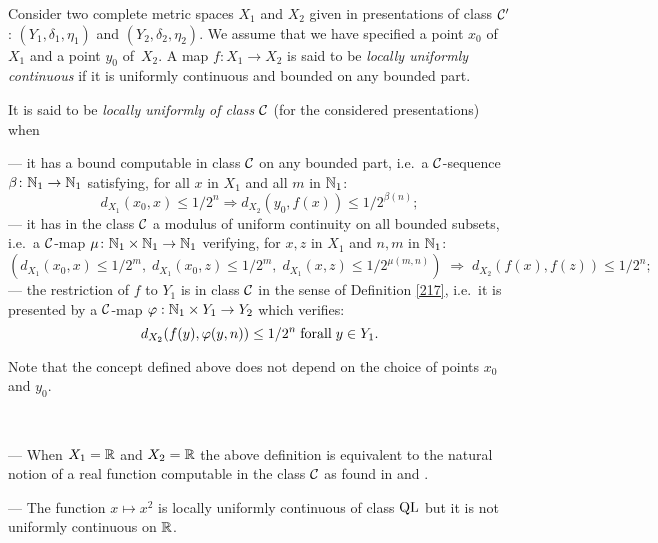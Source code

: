 \begin{definition} \label{231}
Consider two complete metric spaces $X_1$ and $X_2$ given in presentations of class ${{\cal C}}'$: $(Y_1,\delta_1,\eta_1)$ and $(Y_2,\delta_2,\eta_2).$ We assume that we have specified a point $x_0$ of $X_1$ and a point $y_0$ of~$X_2$. A map $f: X_1 \to X_2$ is said to be {\em locally uniformly continuous} if it is uniformly continuous and bounded on any bounded part.

\noindent 
It is said to be {\em locally uniformly of class ${{\cal C}}$} (for the considered presentations) when

\noindent 
--- it has a bound computable in class ${{\cal C}}$ on any bounded part, i.e.\ a ${{\cal C}}$-sequence $\beta\colon \mathbb {N}_1 \to \mathbb {N}_1$ satisfying, for all $x$ in $X_1$ and all $m$ in $\mathbb {N}_1$: 
\[
d_{X_1}(x_0,x) \leq 1/2^n \Rightarrow d_{X_2}(y_0,f(x)) \leq 1/2^{\beta(n)};
\]
--- it has in the class ${{\cal C}}$ a modulus of uniform continuity on all bounded subsets, i.e.\ a ${{\cal C}}$-map $\mu\colon \mathbb {N}_1 \times \mathbb {N}_1 \to \mathbb {N}_1$ verifying, for $x, z$ in $X_1$ and $n, m$ in $\mathbb {N}_1$: 
\[
\left( d_{X_1}(x_0,x) \leq 1/2^m, \; d_{X_1}(x_0,z) \leq 1/2^m, \; d_{X_1}(x,z) \leq 1/2^{\mu(m,n)}\right) \; \Rightarrow\; d_{X_2}(f(x),f(z)) \leq 1/2^n;
\] 
--- the restriction of $f$ to $Y_1$ is in class ${{\cal C}}$ in the sense of Definition \ref{217}, i.e.\ it is presented by a ${{\cal C}}$-map $\varphi:\mathbb {N}_1 \times Y_1 \to Y_2 $ which verifies:
\[
d_{X_2}(f(y),\varphi(y,n)) \leq 1/2^n \;{\rm{for all}} \; y \in Y_1.
\]
\end{definition}
 
Note that the concept defined above does not depend on the choice of points
$x_0$ and $y_0$.
\begin{examples} \label{232}~

\noindent 
--- When $X_1 = \mathbb {R}$ and $X_2 = \mathbb {R}$ the above definition is equivalent to the natural notion of a real function computable in the class ${{\cal C}}$ as found in \cite{Ho90} and \cite{Ko91}.

\noindent 
--- The function $x \mapsto x^2$ is locally uniformly continuous of class ${\rm QL}$ but it is not uniformly continuous on $\mathbb {R}$.
\end{examples}


